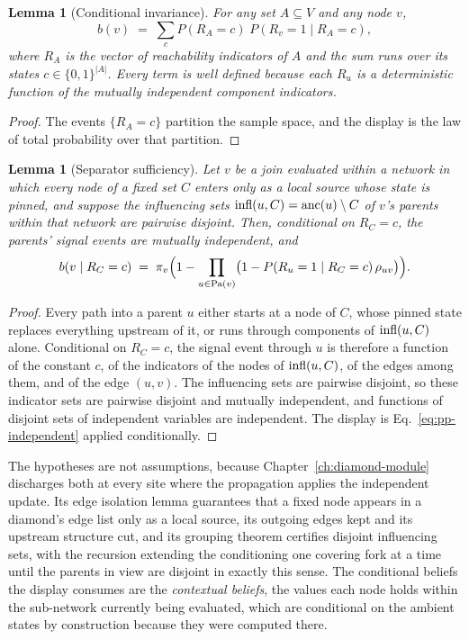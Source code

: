 \documentclass[12pt]{report}
\newtheorem{lemma}[theorem]{Lemma}
\begin{document}
\begin{lemma}[Conditional invariance]
\label{lem:pp-invariance}
For any set $A \subseteq V$ and any node $v$,
\[
b(v) \;=\; \sum_{c} P(R_A = c)\; P(R_v = 1 \mid R_A = c),
\]
where $R_A$ is the vector of reachability indicators of $A$ and the sum runs over its states $c \in \{0,1\}^{|A|}$. Every term is well defined because each $R_u$ is a deterministic function of the mutually independent component indicators.
\end{lemma}

\begin{proof}
The events $\{R_A = c\}$ partition the sample space, and the display is the law of total probability over that partition.
\end{proof}

\begin{lemma}[Separator sufficiency]
\label{lem:pp-separator}
Let $v$ be a join evaluated within a network in which every node of a fixed set $C$ enters only as a local source whose state is pinned, and suppose the influencing sets $\mathrm{infl}(u, C) = \mathrm{anc}(u) \setminus C$ of $v$'s parents within that network are pairwise disjoint. Then, conditional on $R_C = c$, the parents' signal events are mutually independent, and
\[
b(v \mid R_C = c) \;=\; \pi_v \Bigl( 1 - \prod_{u \in \mathrm{Pa}(v)} \bigl( 1 - P(R_u = 1 \mid R_C = c)\,\rho_{uv} \bigr) \Bigr).
\]
\end{lemma}

\begin{proof}
Every path into a parent $u$ either starts at a node of $C$, whose pinned state replaces everything upstream of it, or runs through components of $\mathrm{infl}(u, C)$ alone. Conditional on $R_C = c$, the signal event through $u$ is therefore a function of the constant $c$, of the indicators of the nodes of $\mathrm{infl}(u, C)$, of the edges among them, and of the edge $(u,v)$. The influencing sets are pairwise disjoint, so these indicator sets are pairwise disjoint and mutually independent, and functions of disjoint sets of independent variables are independent. The display is Eq.~\eqref{eq:pp-independent} applied conditionally.
\end{proof}

The hypotheses are not assumptions, because Chapter~\ref{ch:diamond-module} discharges both at every site where the propagation applies the independent update. Its edge isolation lemma guarantees that a fixed node appears in a diamond's edge list only as a local source, its outgoing edges kept and its upstream structure cut, and its grouping theorem certifies disjoint influencing sets, with the recursion extending the conditioning one covering fork at a time until the parents in view are disjoint in exactly this sense. The conditional beliefs the display consumes are the \emph{contextual beliefs}, the values each node holds within the sub-network currently being evaluated, which are conditional on the ambient states by construction because they were computed there.
\end{document}
